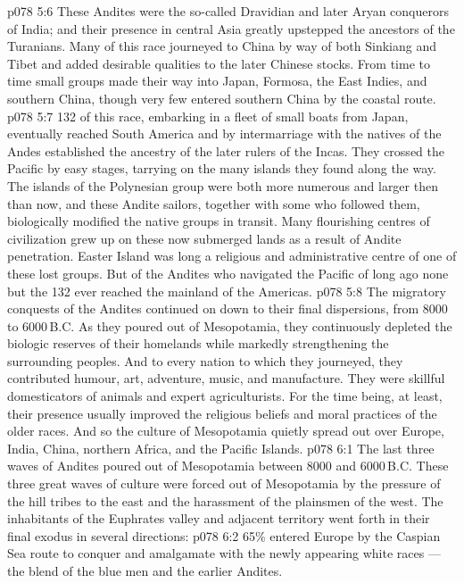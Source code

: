 \vs p078 5:6 These Andites were the so\hyp{}called Dravidian and later Aryan conquerors of India; and their presence in central Asia greatly upstepped the ancestors of the Turanians. Many of this race journeyed to China by way of both Sinkiang and Tibet and added desirable qualities to the later Chinese stocks. From time to time small groups made their way into Japan, Formosa, the East Indies, and southern China, though very few entered southern China by the coastal route.
\vs p078 5:7 132 of this race, embarking in a fleet of small boats from Japan, eventually reached South America and by intermarriage with the natives of the Andes established the ancestry of the later rulers of the Incas. They crossed the Pacific by easy stages, tarrying on the many islands they found along the way. The islands of the Polynesian group were both more numerous and larger then than now, and these Andite sailors, together with some who followed them, biologically modified the native groups in transit. Many flourishing centres of civilization grew up on these now submerged lands as a result of Andite penetration. Easter Island was long a religious and administrative centre of one of these lost groups. But of the Andites who navigated the Pacific of long ago none but the 132 ever reached the mainland of the Americas.
\vs p078 5:8 \pc The migratory conquests of the Andites continued on down to their final dispersions, from 8000 to 6000\,B.C. As they poured out of Mesopotamia, they continuously depleted the biologic reserves of their homelands while markedly strengthening the surrounding peoples. And to every nation to which they journeyed, they contributed humour, art, adventure, music, and manufacture. They were skillful domesticators of animals and expert agriculturists. For the time being, at least, their presence usually improved the religious beliefs and moral practices of the older races. And so the culture of Mesopotamia quietly spread out over Europe, India, China, northern Africa, and the Pacific Islands.
\vs p078 6:1 The last three waves of Andites poured out of Mesopotamia between 8000 and 6000\,B.C. These three great waves of culture were forced out of Mesopotamia by the pressure of the hill tribes to the east and the harassment of the plainsmen of the west. The inhabitants of the Euphrates valley and adjacent territory went forth in their final exodus in several directions:
\vs p078 6:2 65\% entered Europe by the Caspian Sea route to conquer and amalgamate with the newly appearing white races --- the blend of the blue men and the earlier Andites.
